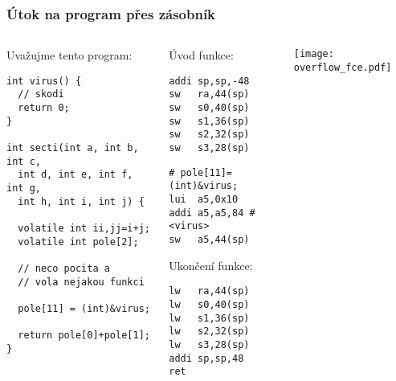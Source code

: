 \documentclass{beamer}
\begin{document}
\begin{frame}[fragile,shrink=5]
\frametitle{Útok na program přes zásobník}

\begin{columns}
\begin{column}{0.42\textwidth}
Uvažujme tento program:

\begin{verbatim}
int virus() {
  // skodi
  return 0;
}

int secti(int a, int b, int c, 
  int d, int e, int f, int g, 
  int h, int i, int j) {
  
  volatile int ii,jj=i+j;
  volatile int pole[2];
  
  // neco pocita a
  // vola nejakou funkci
  
  pole[11] = (int)&virus;
  
  return pole[0]+pole[1];
}
\end{verbatim}
\end{column}   
\begin{column}{0.25\textwidth}
Úvod funkce:

\begin{verbatim}
addi sp,sp,-48
sw   ra,44(sp)
sw   s0,40(sp)
sw   s1,36(sp)
sw   s2,32(sp)
sw   s3,28(sp)
\end{verbatim}


\begin{verbatim}
# pole[11]=(int)&virus;
lui  a5,0x10
addi a5,a5,84 # <virus>
sw   a5,44(sp)
\end{verbatim}

Ukončení funkce:

\begin{verbatim}
lw   ra,44(sp)
lw   s0,40(sp)
lw   s1,36(sp)
lw   s2,32(sp)
lw   s3,28(sp)
addi sp,sp,48
ret
\end{verbatim}
\end{column}
\begin{column}{0.33\textwidth}  
\texttt{[image: overflow\_fce.pdf]}
\end{column}
\end{columns}
\end{frame}
\end{document}
